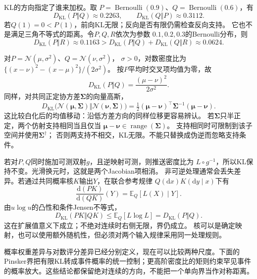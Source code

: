 KL的方向指定了谁来加权。取
\(P=\operatorname{Bernoulli}(0.9)\)、\(Q=\operatorname{Bernoulli}(0.6)\)，有
\[
  D_{\mathrm{KL}}(P\Vert Q)\approx0.2263,\qquad
  D_{\mathrm{KL}}(Q\Vert P)\approx0.3112.
\]
若\(Q(1)=0<P(1)\)，前向KL无限；反向是否有限仍需检查反向支持。
它也不是满足三角不等式的距离。令\(P,Q,R\)依次为参数
\(0.1,0.2,0.3\)的Bernoulli分布，则
\[
  D_{\mathrm{KL}}(P\Vert R)\approx0.1163
  >D_{\mathrm{KL}}(P\Vert Q)+D_{\mathrm{KL}}(Q\Vert R)
  \approx0.0624.
\]

对\(P=\mathcal N(\mu,\sigma^2)\)、\(Q=\mathcal N(\nu,\sigma^2)\)，
\(\sigma>0\)，对数密度比为
\(\{(x-\nu)^2-(x-\mu)^2\}/(2\sigma^2)\)。
按\(P\)平均时交叉项均值为零，故
\begin{equation}
  D_{\mathrm{KL}}(P\Vert Q)=\frac{(\mu-\nu)^2}{2\sigma^2}.
  \label{eq:information-gaussian-location-kl}
\end{equation}
同样，对共同正定协方差\(\bm\Sigma\)的向量高斯，
\begin{equation}
  D_{\mathrm{KL}}\bigl(
    \mathcal N(\bm\mu,\bm\Sigma)\Vert\mathcal N(\bm\nu,\bm\Sigma)\bigr)
  =\tfrac12(\bm\mu-\bm\nu)^\top\bm\Sigma^{-1}(\bm\mu-\bm\nu).
  \label{eq:information-vector-gaussian-translation-kl}
\end{equation}
这比较白化后的均值移动：沿低方差方向的同样位移更容易辨认。
若\(\bm\Sigma\)只半正定，两个仿射支持相同当且仅当
\(\bm\mu-\bm\nu\in\operatorname{range}(\bm\Sigma)\)。
支持相同时可限制到该子空间并使用\(\bm\Sigma^\dagger\)；
否则两支持不相交，KL无限。不能只替换成伪逆而忽略支持条件。

若对\(P,Q\)同时施加可测双射\(g\)，且逆映射可测，则推送密度比为
\(L\circ g^{-1}\)，所以KL保持不变。光滑换元时，这就是两个Jacobian项相消。
非可逆处理通常会丢失差异。若通过共同概率核\(K\)输出\(Y\)，在联合参考规律
\(Q(\mathrm dx)K(\mathrm dy\mid x)\)下有
\[
  \frac{\mathrm d(PK)}{\mathrm d(QK)}(Y)=\mathbb E_Q[L(X)\mid Y].
\]
由\(u\log u\)的凸性和条件Jensen不等式，
\[
  D_{\mathrm{KL}}(PK\Vert QK)
  \leq\mathbb E_Q[L\log L]=D_{\mathrm{KL}}(P\Vert Q).
\]
这在扩展值意义下成立；不绝对连续时右侧无限，界仍成立。
核可以是确定映射，也可以使用额外随机性，但必须对两个输入规律采用同一处理规则。

\par\medskip
概率权重差异与对数评分差异已经分别定义，现在可以比较两种尺度。下面的Pinsker界把有限KL转成事件概率的统一控制；更高阶密度比的矩则约束罕见事件的概率放大。这些结论都保留绝对连续的方向，不能把一个单向界当作对称距离。

